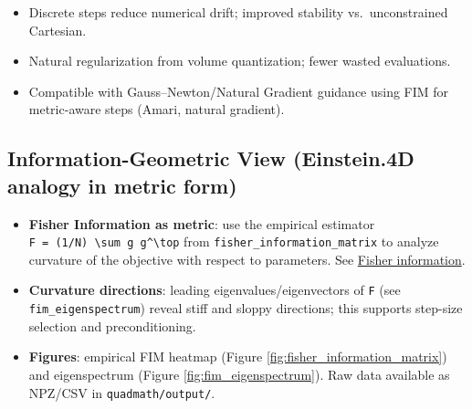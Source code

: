 \documentclass[
  10pt,
]{article}
\providecommand{\tightlist}{%
  \setlength{\itemsep}{0pt}\setlength{\parskip}{0pt}}
\begin{document}
\begin{itemize}
\tightlist
\item
  Discrete steps reduce numerical drift; improved stability
  vs.~unconstrained Cartesian.
\item
  Natural regularization from volume quantization; fewer wasted
  evaluations.
\item
  Compatible with Gauss--Newton/Natural Gradient guidance using FIM for
  metric-aware steps (Amari, natural gradient).
\end{itemize}

\hypertarget{information-geometric-view-einstein.4d-analogy-in-metric-form}{%
\subsection{Information-Geometric View (Einstein.4D analogy in metric
form)}\label{information-geometric-view-einstein.4d-analogy-in-metric-form}}

\begin{itemize}
\tightlist
\item
  \textbf{Fisher Information as metric}: use the empirical estimator
  \texttt{F\ =\ (1/N)\ \textbackslash{}sum\ g\ g\^{}\textbackslash{}top}
  from \texttt{fisher\_information\_matrix} to analyze curvature of the
  objective with respect to parameters. See
  \href{https://en.wikipedia.org/wiki/Fisher_information}{Fisher
  information}.
\item
  \textbf{Curvature directions}: leading eigenvalues/eigenvectors of
  \texttt{F} (see \texttt{fim\_eigenspectrum}) reveal stiff and sloppy
  directions; this supports step-size selection and preconditioning.
\item
  \textbf{Figures}: empirical FIM heatmap (Figure
  \ref{fig:fisher_information_matrix}) and eigenspectrum (Figure
  \ref{fig:fim_eigenspectrum}). Raw data available as NPZ/CSV in
  \texttt{quadmath/output/}.
\end{itemize}
\end{document}
